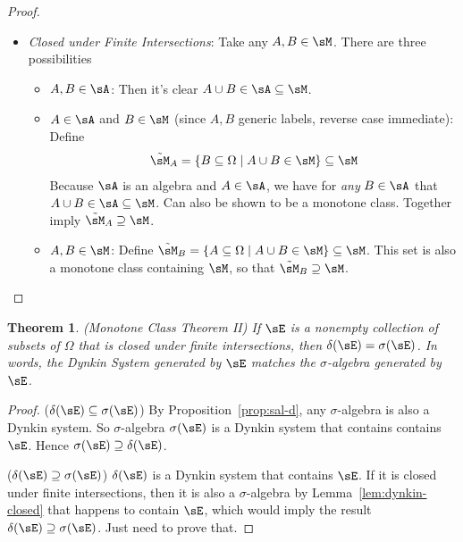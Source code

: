 \documentclass[12pt]{article}
\theoremstyle{plain}
\newtheorem{thm}{Theorem}[section]
\theoremstyle{definition}
\theoremstyle{remark}
\begin{document}
\begin{proof}
\begin{itemize}
  \item \emph{Closed under Finite Intersections}:
    Take any $A,B\in \sM$.
    There are three possibilities
    \begin{itemize}
      \item $A,B\in\sA$: Then it's clear
        $A\cup B\in\sA\subseteq \sM$.
      \item $A\in\sA$ and $B\in \sM$ (since $A,B$ generic labels,
        reverse case immediate):
        Define
        \begin{align*}
          \tilde{\sM}_A =\{B\subseteq\Omega \;|\; A\cup B\in\sM\}
          \subseteq
          \sM
        \end{align*}
        Because $\sA$ is an algebra and $A\in\sA$,
        we have for \emph{any} $B\in\sA$ that $A\cup
        B\in\sA\subseteq\sM$.
        Can also be shown to be a monotone class.
        Together imply $\tilde{\sM}_A\supseteq\sM$.

      \item $A,B\in \sM$: Define
        $\tilde{\sM}_B =\{A\subseteq\Omega \;|\; A\cup B\in\sM\}
        \subseteq \sM$.
        This set is also a monotone class containing $\sM$, so that
        $\tilde{\sM}_B\supseteq \sM$.
    \end{itemize}
\end{itemize}
\end{proof}
\clearpage

\begin{thm}\emph{(Monotone Class Theorem II)}
\label{thm:mct-2}
If $\sE$ is a nonempty collection of subsets of $\Omega$ that is closed
under finite intersections, then $\delta(\sE)=\sigma(\sE)$.
In words, the Dynkin System generated by $\sE$ matches the
$\sigma$-algebra generated by $\sE$.
\end{thm}
\begin{proof}
($\delta(\sE)\subseteq\sigma(\sE)$)
By Proposition~\ref{prop:sal-d},
any $\sigma$-algebra is also a Dynkin system.
So $\sigma$-algebra $\sigma(\sE)$ is a Dynkin system that contains
contains $\sE$. Hence $\sigma(\sE)\supseteq \delta(\sE)$.

($\delta(\sE)\supseteq\sigma(\sE)$)
$\delta(\sE)$ is a Dynkin system that contains $\sE$.
If it is closed under finite intersections, then it is also a
$\sigma$-algebra by Lemma~\ref{lem:dynkin-closed} that happens to
contain $\sE$, which would imply the result
$\delta(\sE)\supseteq\sigma(\sE)$.
Just need to prove that.
\end{proof}
\end{document}
